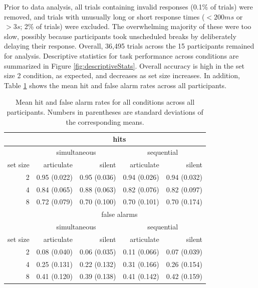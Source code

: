 
Prior to data analysis, all trials containing invalid responses (0.1\% of trials) were removed, and trials with unusually long or short response times ($<200ms$ or $>3s$; 2\% of trials) were excluded. The overwhelming majority of these were too slow, possibly because participants took unscheduled breaks by deliberately delaying their response. Overall, 36,495 trials across the 15 participants remained for analysis. Descriptive statistics for task performance across conditions are summarized in Figure \ref{fig:descriptiveStats}. Overall accuracy is high in the set size 2 condition, as expected, and decreases as set size increases. In addition, Table \ref{tab:descriptiveStats} shows the mean hit and false alarm rates across all participants.

\begin{table}[ht]
{
\centering
\begin{tabular}{rrrrr}
  \hline
& \multicolumn{4}{c}{hits}\\
  \hline
& \multicolumn{2}{c}{simultaneous} & \multicolumn{2}{c}{sequential} \\
 set size & articulate & silent & articulate & silent \\ 
  \hline
  2 & 0.95 (0.022) & 0.95 (0.036) & 0.94 (0.026) & 0.94 (0.032) \\ 
  4 & 0.84 (0.065) & 0.88 (0.063) & 0.82 (0.076) & 0.82 (0.097) \\ 
  8 & 0.72 (0.079) & 0.70 (0.100) & 0.70 (0.101) & 0.70 (0.174) \\ 
  \hline
 & \multicolumn{4}{c}{false alarms}\\
  \hline
& \multicolumn{2}{c}{simultaneous} & \multicolumn{2}{c}{sequential}\\
set size & articulate & silent & articulate & silent \\ 
  \hline
  2 & 0.08 (0.040) & 0.06 (0.035) & 0.11 (0.066) & 0.07 (0.039) \\
  4 & 0.25 (0.131) & 0.22 (0.132) & 0.31 (0.166) & 0.26 (0.154) \\
  8 & 0.41 (0.120) & 0.39 (0.138) & 0.41 (0.142) & 0.42 (0.159) \\
\hline
\end{tabular}
}
\caption{Mean hit and false alarm rates for all conditions across all participants. Numbers in parentheses are standard deviations of the corresponding means.} 
\label{tab:descriptiveStats}
\end{table}

